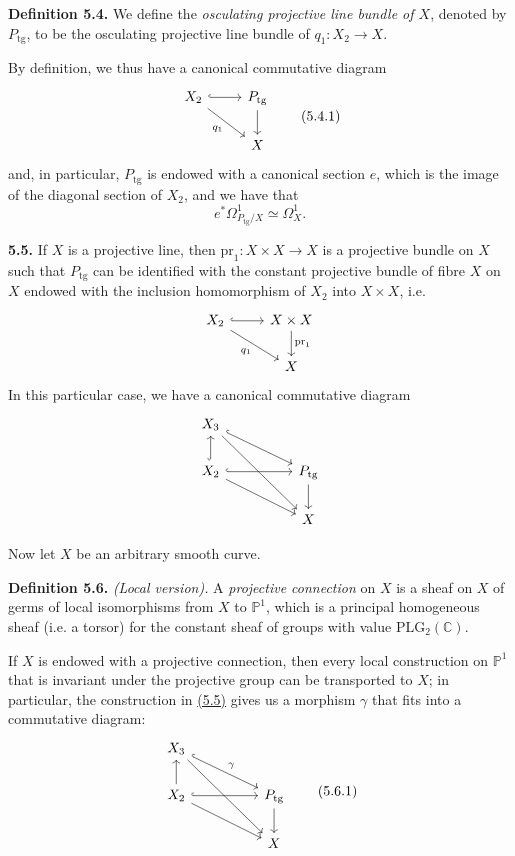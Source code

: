 \documentclass{report}
\newenvironment{rmenv}[1]
  {\phantomsection\par\medskip\noindent\textbf{#1.}\rmfamily}
  {\par\medskip}
\newcommand{\PP}{\mathbb{P}}
\newcommand{\CC}{\mathbb{C}}
\newcommand{\pr}{\mathrm{pr}}
\newcommand{\tg}{\mathrm{tg}}
\newcommand{\oldpage}[1]{\marginpar{\footnotesize$\Big\vert$ \textit{p.~#1}}}
\begin{document}
\begin{rmenv}{Definition 5.4}
\label{I.5.4}
  We define the \emph{osculating projective line bundle of $X$}, denoted by $P_\tg$, to be the osculating projective line bundle of $q_1\colon X_2\to X$.
\end{rmenv}

By definition, we thus have a canonical commutative diagram
\[
\label{I.5.4.1}
  \begin{tikzcd}
    X_2 \rar[hook] \drar[swap,"q_1"]
    & P_\tg \dar
  \\& X
  \end{tikzcd}
\tag{5.4.1}
\]
and, in particular, $P_\tg$ is endowed with a canonical section $e$, which is the image of the diagonal section of $X_2$, and we have that
\[
\label{I.5.4.2}
  e^*\Omega_{P_\tg/X}^1 \simeq \Omega_X^1.
\tag{5.4.2}
\]

\begin{rmenv}{5.5}
\label{I.5.5}
  If $X$ is a projective line, then $\pr_1\colon X\times X\to X$ is a projective bundle on $X$ such that $P_\tg$ can be identified with the constant projective bundle of fibre $X$ on $X$ endowed with the inclusion homomorphism of $X_2$ into $X\times X$, i.e.
  \[
    \begin{tikzcd}
      X_2 \rar[hook] \drar[swap,"q_1"]
      & X\times X \dar["\pr_1"]
    \\& X
    \end{tikzcd}
  \]
\oldpage{31}
  In this particular case, we have a canonical commutative diagram
  \[
    \begin{tikzcd}[column sep=huge]
      X_3 \drar[hook] \ar[ddr]
    \\X_2 \uar[hook] \rar[hook] \drar
      & P_\tg \dar
    \\& X
    \end{tikzcd}
  \]
\end{rmenv}

Now let $X$ be an arbitrary smooth curve.

\begin{rmenv}{Definition 5.6}
\label{I.5.6}
  \emph{(Local version).}
  A \emph{projective connection} on $X$ is a sheaf on $X$ of germs of local isomorphisms from $X$ to $\PP^1$, which is a principal homogeneous sheaf (i.e. a torsor) for the constant sheaf of groups with value $\mathrm{PLG}_2(\CC)$.
\end{rmenv}

If $X$ is endowed with a projective connection, then every local construction on $\PP^1$ that is invariant under the projective group can be transported to $X$;
in particular, the construction in \hyperref[I.5.5]{(5.5)} gives us a morphism $\gamma$ that fits into a commutative diagram:
\[
\label{I.5.6.1}
  \begin{tikzcd}[column sep=huge]
    X_3 \drar[hook,"\gamma"] \ar[ddr]
  \\X_2 \uar \rar[hook] \drar
    & P_\tg \dar
  \\& X
  \end{tikzcd}
\tag{5.6.1}
\]
\end{document}
